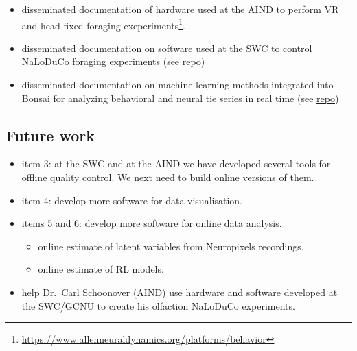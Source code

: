 \begin{itemize}
    \item  disseminated documentation of hardware used at the AIND to perform
        VR and head-fixed foraging
        exeperiments\footnote{\url{https://www.allenneuraldynamics.org/platforms/behavior}}.

    \item  disseminated documentation on software used at the SWC to control
        NaLoDuCo foraging experiments (see
        \href{https://github.com/SainsburyWellcomeCentre/aeon_mecha.}{repo})

    \item  disseminated documentation on machine learning methods integrated
        into Bonsai for analyzing behavioral and neural tie series in real time
        (see \href{https://bonsai-rx.org/machinelearning/.}{repo})

\end{itemize}

\subsection{Future work}

\begin{itemize}

    \item item 3: at the SWC and at the AIND we have developed several tools for offline quality control. We next need to build online versions of them.

    \item item 4: develop more software for data visualisation.

    \item items 5 and 6: develop more software for online data analysis.

    \begin{itemize}

        \item online estimate of latent variables from Neuropixels recordings.

        \item online estimate of RL models.

    \end{itemize}

    \item help Dr.~Carl Schoonover (AIND) use hardware and software developed at the SWC/GCNU to create his olfaction NaLoDuCo experiments.

\end{itemize}

